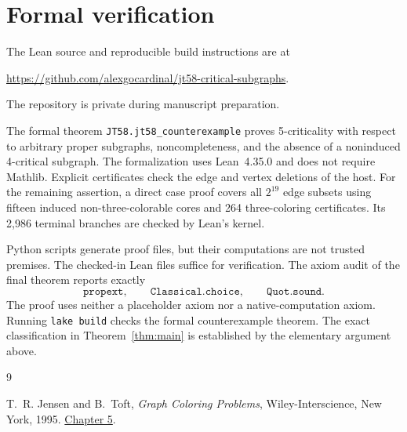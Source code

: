 \documentclass[11pt]{article}
\begin{document}
\section{Formal verification}

The Lean source and reproducible build instructions are at
\begin{center}
\url{https://github.com/alexgocardinal/jt58-critical-subgraphs}.
\end{center}
The repository is private during manuscript preparation.

The formal theorem \texttt{JT58.jt58\_counterexample} proves
5-criticality with respect to arbitrary proper subgraphs,
noncompleteness, and the absence of a noninduced 4-critical
subgraph. The formalization uses Lean~4.35.0 and does not
require Mathlib. Explicit certificates check the edge and
vertex deletions of the host. For the remaining assertion,
a direct case proof covers all $2^{19}$ edge subsets using
fifteen induced non-three-colorable cores and 264
three-coloring certificates. Its 2,986 terminal branches
are checked by Lean's kernel.

Python scripts generate proof files, but their computations
are not trusted premises. The checked-in Lean files suffice
for verification. The axiom audit of the final theorem reports
exactly
\[
  \texttt{propext},\qquad
  \texttt{Classical.choice},\qquad
  \texttt{Quot.sound}.
\]
The proof uses neither a placeholder axiom nor a
native-computation axiom. Running \texttt{lake build}
checks the formal counterexample theorem. The exact
classification in Theorem~\ref{thm:main} is established
by the elementary argument above.

\begin{thebibliography}{9}

T.~R. Jensen and B.~Toft,
\emph{Graph Coloring Problems},
Wiley-Interscience, New York, 1995.
\href{https://doi.org/10.1002/9781118032497.ch5}{Chapter 5}.

\end{thebibliography}
\end{document}
